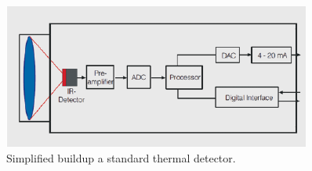 \begin{figure}[H]                                         
	\includegraphics[width=.55\textwidth]{figures/IR_cam}  
	\caption{Simplified buildup a standard thermal detector.\cite{optris2009}}
	\label{fig:em_spectrum}  
\end{figure} 









